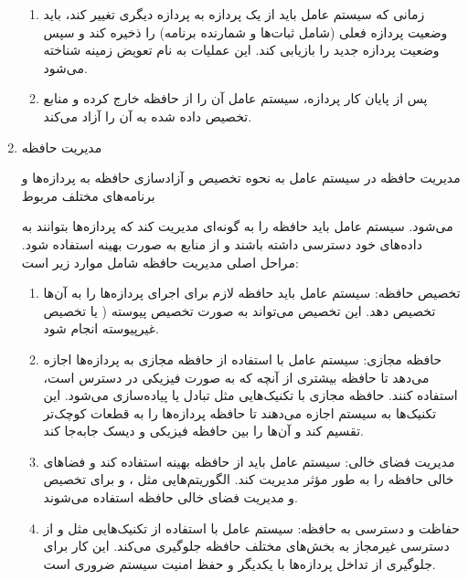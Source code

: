 \begin{enumerate}
\begin{qsolve}
\begin{enumerate}
			\item {}
			زمانی که سیستم عامل باید از یک پردازه به پردازه دیگری تغییر کند، باید وضعیت پردازه فعلی (شامل ثبات‌ها و شمارنده برنامه) را ذخیره کند و سپس وضعیت پردازه جدید را بازیابی کند. این عملیات به نام تعویض زمینه شناخته می‌شود.
			
			\item {}
			پس از پایان کار پردازه، سیستم عامل آن را از حافظه خارج کرده و منابع تخصیص داده شده به آن را آزاد می‌کند.
		\end{enumerate}
	\end{qsolve}
	
	
	\item 
	مدیریت حافظه
	\begin{qsolve}
		مدیریت حافظه در سیستم عامل به نحوه تخصیص و آزادسازی حافظه به پردازه‌ها و برنامه‌های مختلف مربوط 
	\end{qsolve}
	
	
	\begin{qsolve}
		می‌شود. سیستم عامل باید حافظه را به گونه‌ای مدیریت کند که پردازه‌ها بتوانند به داده‌های خود دسترسی داشته باشند و از منابع به صورت بهینه استفاده شود. مراحل اصلی مدیریت حافظه شامل موارد زیر است:
		
		\begin{enumerate}
			\item 
			تخصیص حافظه: سیستم عامل باید حافظه لازم برای اجرای پردازه‌ها را به آن‌ها تخصیص دهد. این تخصیص می‌تواند به صورت تخصیص پیوسته ( یا تخصیص غیرپیوسته  انجام شود.
			
			\item 
			حافظه مجازی: سیستم عامل با استفاده از حافظه مجازی به پردازه‌ها اجازه می‌دهد تا حافظه بیشتری از آنچه که به صورت فیزیکی در دسترس است، استفاده کنند. حافظه مجازی با تکنیک‌هایی مثل تبادل  یا  پیاده‌سازی می‌شود. این تکنیک‌ها به سیستم اجازه می‌دهند تا حافظه پردازه‌ها را به قطعات کوچک‌تر تقسیم کند و آن‌ها را بین حافظه فیزیکی و دیسک جابه‌جا کند.
			
			\item 
			مدیریت فضای خالی: سیستم عامل باید از حافظه بهینه استفاده کند و فضاهای خالی حافظه را به طور مؤثر مدیریت کند. الگوریتم‌هایی مثل ،  و  برای تخصیص و مدیریت فضای خالی حافظه استفاده می‌شوند.
			
			\item 
			حفاظت و دسترسی به حافظه: سیستم عامل با استفاده از تکنیک‌هایی مثل  و  از دسترسی غیرمجاز به بخش‌های مختلف حافظه جلوگیری می‌کند. این کار برای جلوگیری از تداخل پردازه‌ها با یکدیگر و حفظ امنیت سیستم ضروری است.
		\end{enumerate}
	\end{qsolve}
	
	
\end{enumerate}






